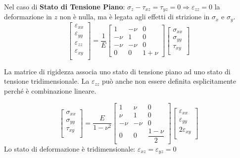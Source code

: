 \documentclass{article}
\begin{document}
\begin{adjustwidth}{2in}{}
Nel caso di \textbf{Stato di Tensione Piano}: $ \sigma_z - \tau_{xz} = \tau_{yz} = 0 \Rightarrow \varepsilon_{zz} = 0$ la deformazione in $z$ non è nulla, ma è legata agli effetti di strizione in $\sigma_x$ e $\sigma_y$.
	\[
	\left[\begin{array}{c}
		\varepsilon_{xx} \\
		\varepsilon_{yy} \\
		\varepsilon_{zz} \\
		\varepsilon_{xy} \\
	\end{array} \right] = \frac{1}{E} \left[ \begin{array}{ccc}
		1 & -\nu & 0 \\
		-\nu & 1 & 0 \\
		-\nu & -\nu & 0\\
		0 & 0  & 1 + \nu 
	\end{array}\right] \left[ \begin{array}{c}
		\sigma_{xx} \\
		\sigma_{yy} \\
		\tau_{xy} \\
	\end{array} \right] 
	\]

	La matrice di rigidezza associa uno stato di tensione piano ad uno stato di tensione tridimensionale.  
\newpage	
	La $\varepsilon_{zz}$ può anche non essere definita esplicitamente perché è combinazione lineare.  

	\[
	  \left[ \begin{array}{c}
 		\sigma_{xx} \\
 		\sigma_{yy} \\
 		\tau_{xy} \\
 	\end{array} \right] = \frac{E}{1-\nu^2} \left[ \begin{array}{ccc}
			1 & \nu & 0 \\
			\nu & 1 & 0 \\
			-\nu & -\nu & 0\\
			0 & 0  & \dfrac{1 - \nu}{2} 
	\end{array}\right] \left[\begin{array}{c}
		\varepsilon_{xx} \\
		\varepsilon_{yy} \\
		2\varepsilon_{xy} \\
	\end{array} \right] 
	\]
	Lo stato di deformazione è tridimensionale: $\varepsilon_{xz} = \varepsilon_{yz}=0$ \newline 


\end{adjustwidth}
\end{document}
